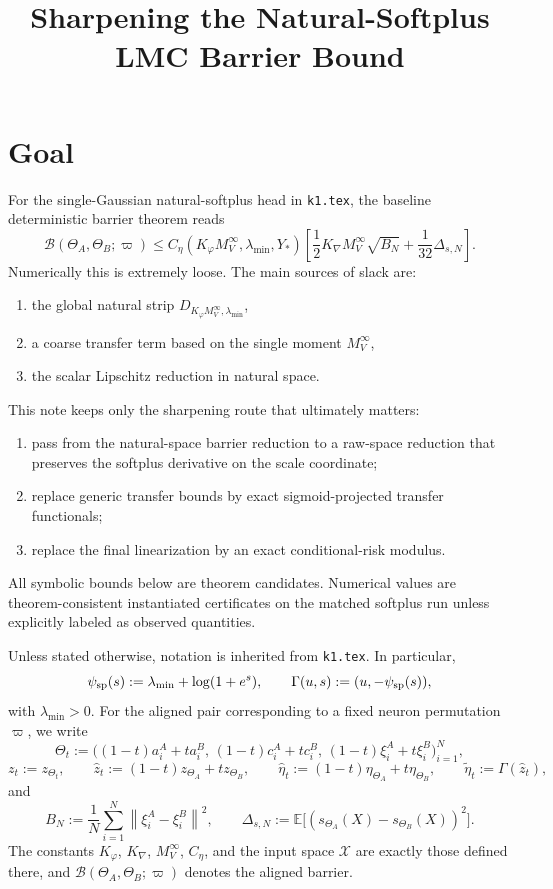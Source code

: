 \documentclass[11pt]{article}
\title{Sharpening the Natural-Softplus LMC Barrier Bound}
\author{}
\date{}
\newcommand{\E}{\mathbb{E}}
\newcommand{\norm}[1]{\left\lVert #1 \right\rVert}
\newcommand{\cB}{\mathcal{B}}
\begin{document}
\maketitle

\section{Goal}

For the single-Gaussian natural-softplus head in \texttt{k1.tex}, the baseline
deterministic barrier theorem reads
\begin{equation}
  \cB(\Theta_A,\Theta_B;\varpi)
  \le
  C_\eta(K_\varphi M_V^\infty,\lambda_{\min},Y_\ast)
  \left[
    \frac12 K_\nabla M_V^\infty \sqrt{B_N}
    +
    \frac1{32}\Delta_{s,N}
  \right].
  \label{eq:baseline-barrier}
\end{equation}
Numerically this is extremely loose. The main sources of slack are:
\begin{enumerate}[label=(\roman*)]
  \item the global natural strip
  $D_{K_\varphi M_V^\infty,\lambda_{\min}}$,
  \item a coarse transfer term based on the single moment $M_V^\infty$,
  \item the scalar Lipschitz reduction in natural space.
\end{enumerate}

This note keeps only the sharpening route that ultimately matters:
\begin{enumerate}[label=(\arabic*)]
  \item pass from the natural-space barrier reduction to a raw-space reduction
  that preserves the softplus derivative on the scale coordinate;
  \item replace generic transfer bounds by exact sigmoid-projected transfer
  functionals;
  \item replace the final linearization by an exact conditional-risk modulus.
\end{enumerate}
All symbolic bounds below are theorem candidates. Numerical values are
theorem-consistent instantiated certificates on the matched softplus run unless
explicitly labeled as observed quantities.

Unless stated otherwise, notation is inherited from \texttt{k1.tex}. In
particular,
\[
  \psi_{\rm sp}(s):=\lambda_{\min}+\log(1+e^s),
  \qquad
  \Gamma(u,s):=(u,-\psi_{\rm sp}(s)),
\]
with $\lambda_{\min}>0$. For the aligned pair corresponding to a fixed neuron
permutation $\varpi$, we write
\[
  \Theta_t
  :=
  \bigl(
    (1-t)a_i^A+t a_i^B,\,
    (1-t)c_i^A+t c_i^B,\,
    (1-t)\xi_i^A+t\xi_i^B
  \bigr)_{i=1}^N,
\]
\[
  z_t:=z_{\Theta_t},
  \qquad
  \hat z_t:=(1-t)z_{\Theta_A}+t z_{\Theta_B},
  \qquad
  \hat\eta_t:=(1-t)\eta_{\Theta_A}+t\eta_{\Theta_B},
  \qquad
  \tilde\eta_t:=\Gamma(\hat z_t),
\]
and
\[
  B_N:=\frac1N\sum_{i=1}^N \norm{\xi_i^A-\xi_i^B}^2,
  \qquad
  \Delta_{s,N}:=\E\big[(s_{\Theta_A}(X)-s_{\Theta_B}(X))^2\big].
\]
The constants $K_\varphi$, $K_\nabla$, $M_V^\infty$, $C_\eta$, and the input
space $\mathcal X$ are exactly those defined there, and
$\cB(\Theta_A,\Theta_B;\varpi)$ denotes the aligned barrier.
\end{document}

